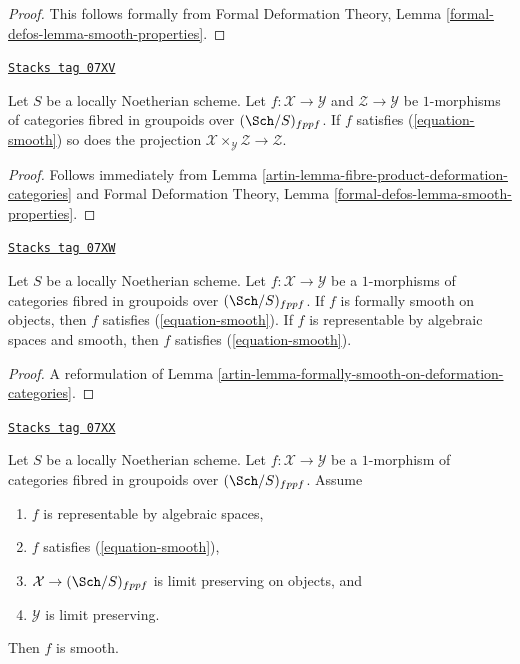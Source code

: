 \begin{proof}
This follows formally from Formal Deformation Theory, Lemma
\ref{formal-defos-lemma-smooth-properties}.
\end{proof}

\begin{lemma}
\label{artin-lemma-base-change-smooth}
\href{https://stacks.math.columbia.edu/tag/07XV}{\texttt{Stacks tag 07XV}}

Let $S$ be a locally Noetherian scheme. Let $f : \mathcal{X} \to \mathcal{Y}$
and $\mathcal{Z} \to \mathcal{Y}$ be $1$-morphisms of
categories fibred in groupoids over $(\Sch/S)_{fppf}$. If $f$
satisfies (\ref{equation-smooth}) so does the projection
$\mathcal{X} \times_\mathcal{Y} \mathcal{Z} \to \mathcal{Z}$.
\end{lemma}

\begin{proof}

Follows immediately from
Lemma \ref{artin-lemma-fibre-product-deformation-categories}
and
Formal Deformation Theory, Lemma
\ref{formal-defos-lemma-smooth-properties}.
\end{proof}

\begin{lemma}
\label{artin-lemma-smooth-smooth}
\href{https://stacks.math.columbia.edu/tag/07XW}{\texttt{Stacks tag 07XW}}

Let $S$ be a locally Noetherian scheme. Let $f : \mathcal{X} \to \mathcal{Y}$
be a $1$-morphisms of categories fibred in groupoids over $(\Sch/S)_{fppf}$.
If $f$ is formally smooth on objects, then $f$ satisfies
(\ref{equation-smooth}). If $f$ is representable by algebraic spaces
and smooth, then $f$ satisfies (\ref{equation-smooth}).
\end{lemma}

\begin{proof}

A reformulation of Lemma \ref{artin-lemma-formally-smooth-on-deformation-categories}.
\end{proof}

\begin{lemma}
\label{artin-lemma-implies-smooth}
\href{https://stacks.math.columbia.edu/tag/07XX}{\texttt{Stacks tag 07XX}}

Let $S$ be a locally Noetherian scheme. Let $f : \mathcal{X} \to \mathcal{Y}$
be a $1$-morphism of categories fibred in groupoids over $(\Sch/S)_{fppf}$.
Assume
\begin{enumerate}
\item $f$ is representable by algebraic spaces,
\item $f$ satisfies (\ref{equation-smooth}),
\item $\mathcal{X} \to (\Sch/S)_{fppf}$ is limit preserving on objects, and
\item $\mathcal{Y}$ is limit preserving.
\end{enumerate}
Then $f$ is smooth.
\end{lemma}

